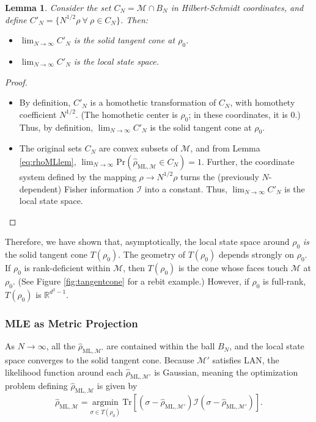 \documentclass[aps,pra, twocolumn]{revtex4-1}
\newcommand{\M}{\mathcal{M}}
\newcommand{\rhohat}{\hat{\rho}}
\newcommand{\rhoML}[1]{\rhohat_{\scriptscriptstyle{\mathrm{ML},#1}}}
\newtheorem{lem}{Lemma}
\begin{document}
\begin{lem}Consider the set $C_{N} = \M \cap B_{N}$ in Hilbert-Schmidt coordinates, and define $C'_{N} = \{N^{1/2}\rho~\forall~\rho \in C_{N}\}$. Then:
\begin{itemize}
\item [1)] $\lim_{N\rightarrow \infty}C'_{N}$ is the solid tangent cone at $\rho_{0}$.
\item [2)] $\lim_{N\rightarrow \infty}C'_{N}$ is the local state space.
\end{itemize}
\end{lem}
\begin{proof}~\\
\begin{itemize}
\item [1)] By definition, $C'_{N}$ is a homothetic transformation of $C_{N}$, with homothety coefficient $N^{1/2}$. (The homothetic center is $\rho_{0}$; in these coordinates, it is 0.) Thus, by definition, $\lim_{N\rightarrow \infty}C'_{N}$ is the solid tangent cone at $\rho_{0}$.
\item [2)] The original sets $C_{N}$ are convex subsets of $\M$, and from Lemma \ref{eq:rhoMLlem}, $\lim_{N\rightarrow \infty}\mathrm{Pr}(\rhoML{\M} \in C_{N}) = 1$.  Further, the coordinate system defined by the mapping $\rho \rightarrow N^{1/2}\rho$ turns the (previously $N$-dependent) Fisher information $\mathcal{I}$ into a constant. Thus, $\lim_{N\rightarrow \infty}C'_{N}$ is the local state space.
\end{itemize}
\end{proof}

Therefore, we have shown that, asymptotically, the local state space around $\rho_{0}$ \emph{is} the solid tangent cone $T(\rho_{0})$.
The geometry of $T(\rho_{0})$ depends strongly on $\rho_{0}$. If $\rho_{0}$ is rank-deficient within $\M$, then $T(\rho_{0})$ is the cone whose faces touch $\M$ at $\rho_{0}$. (See Figure \ref{fig:tangentcone} for a rebit example.) However, if $\rho_{0}$ is full-rank, $T(\rho_{0})$ is $\mathbb{R}^{d^{2}-1}$.

\subsubsection{MLE as Metric Projection}

As $N \rightarrow \infty$, all the $\rhoML{\M'}$ are contained within the ball $B_{N}$, and the local state space converges to the solid tangent cone. Because $\M'$ satisfies LAN, the likelihood function around each $\rhoML{\M'}$ is Gaussian, meaning the optimization problem defining $\rhoML{\M}$ is given by \begin{equation}
\label{eq:MP-LANmle2}
\rhoML{\M} = \underset{\sigma \in T(\rho_{0})}{\text{argmin}}~\mathrm{Tr}[(\sigma  -\rhoML{\M'})\mathcal{I}(\sigma  -\rhoML{\M'})].
\end{equation}
\end{document}
